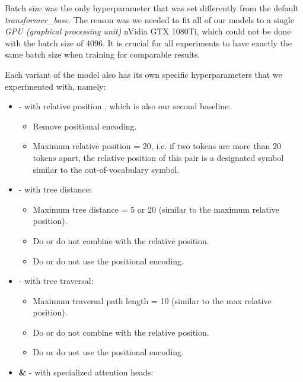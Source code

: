 Batch size was the only hyperparameter that was set differently from the default \textit{transformer\_base}. The reason was we needed to fit all of our models to a single \textit{GPU (graphical processing unit)} nVidia GTX 1080Ti, which could not be done with the batch size of 4096. It is crucial for all experiments to have exactly the same batch size when training for comparable results.

Each variant of the \transformer model also has its own specific hyperparameters that we experimented with, namely:

\begin{itemize}
    \item \textbf{\transformerrel} - \transformer with relative position \citep{DBLP:conf/naacl/ShawUV18}, which is also our second baseline:
        \begin{itemize}
            \item Remove positional encoding.
            \item Maximum relative position = 20, i.e. if two tokens are more than 20 tokens apart, the relative position of this pair is a designated symbol similar to the out-of-vocabulary symbol.
        \end{itemize}
    \item \textbf{\TreeDistance} - \transformer with tree distance:
        \begin{itemize}
            \item Maximum tree distance = 5 or 20 (similar to the maximum relative position).
            \item Do or do not combine with the relative position.
            \item Do or do not use the positional encoding.
        \end{itemize}
    \item \textbf{\TreeTraversal} - \transformer with tree traversal:
        \begin{itemize}
            \item Maximum traversal path length = 10 (similar to the max relative position).
            \item Do or do not combine with the relative position.
            \item Do or do not use the positional encoding.
        \end{itemize}
    \item \textbf{\SpecPOS \& \SpecDep} - \transformer with specialized attention heads:
        \begin{itemize}

\end{itemize}
\end{itemize}
